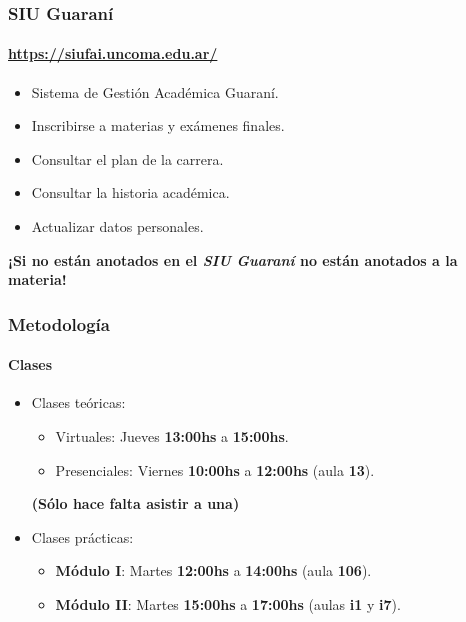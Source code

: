 \documentclass[11pt,a4paper,spanish]{beamer}
\begin{document}
\begin{frame}

    \frametitle{SIU Guaraní}
    \framesubtitle{\url{https://siufai.uncoma.edu.ar/}}

\begin{itemize}
    \item Sistema de Gestión Académica Guaraní.
    \item Inscribirse a materias y exámenes finales.
    \item Consultar el plan de la carrera.
    \item Consultar la historia académica.
    \item Actualizar datos personales.
\end{itemize}

\textbf{¡Si no están anotados en el \emph{SIU Guaraní} no están anotados a la
    materia!}

\end{frame}

\begin{frame}

    \frametitle{Metodología}
    \framesubtitle{Clases}

\begin{itemize}
    \item Clases teóricas:
    \begin{itemize}
        \item Virtuales: Jueves \textbf{13:00hs} a \textbf{15:00hs}.
        \item Presenciales: Viernes \textbf{10:00hs} a \textbf{12:00hs} (aula
            \textbf{13}).
    \end{itemize}
        \textbf{(Sólo hace falta asistir a una)}
    \item Clases prácticas:
    \begin{itemize}
        \item \textbf{Módulo I}: Martes \textbf{12:00hs} a \textbf{14:00hs}
            (aula \textbf{106}).
        \item \textbf{Módulo II}: Martes \textbf{15:00hs} a \textbf{17:00hs}
            (aulas \textbf{i1} y \textbf{i7}).
    \end{itemize}

\end{itemize}

\end{frame}
\end{document}
